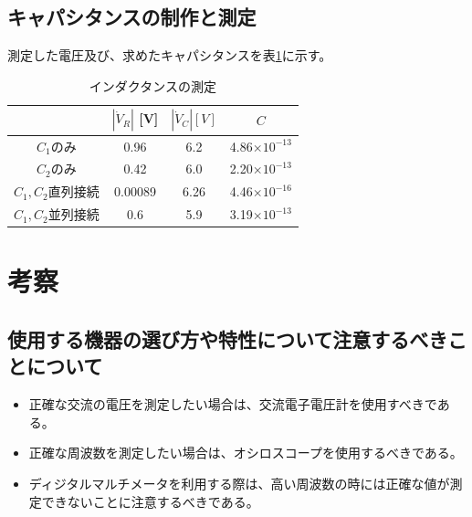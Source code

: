 \documentclass[dvipdfmx]{jsarticle}
\begin{document}
\subsection{キャパシタンスの制作と測定}
測定した電圧及び、求めたキャパシタンスを表\ref{tb:result10}に示す。
\begin{table}[h]
  \centering
  \caption{インダクタンスの測定}
  \label{tb:result10}
  \begin{tabular}{|c|c|c|c|}\hline
    & $|\dot V_R|$ [V] & $|\dot V_C| [V]$ & $C$\\ \hline
    $C_1$のみ & 0.96 & 6.2 & 4.86$\times 10^{-13}$\\ \hline
    $C_2$のみ & 0.42 & 6.0 & 2.20$\times 10^{-13}$\\ \hline
    $C_1, C_2$直列接続 & 0.00089 & 6.26 & 4.46$\times 10^{-16}$\\ \hline
    $C_1, C_2$並列接続 & 0.6 & 5.9 & 3.19$\times 10^{-13}$\\ \hline
  \end{tabular}
\end{table}

\section{考察}
\subsection{使用する機器の選び方や特性について注意するべきことについて}
\begin{itemize}
  \item 正確な交流の電圧を測定したい場合は、交流電子電圧計を使用すべきである。
  \item 正確な周波数を測定したい場合は、オシロスコープを使用するべきである。
  \item ディジタルマルチメータを利用する際は、高い周波数の時には正確な値が測定できないことに注意するべきである。
\end{itemize}
\end{document}
